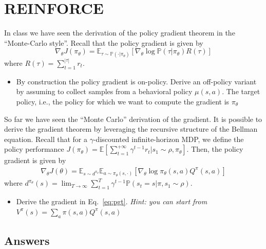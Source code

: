 \documentclass[a4paper]{article}
\begin{document}
\section{REINFORCE}
In class we have seen the derivation of the policy gradient theorem in the ``Monte-Carlo style''. Recall that the policy gradient is given by
\[
    \nabla_\theta J(\pi_\theta) = \mathbb{E}_{\tau \sim \mathbb{P}(\cdot|\pi_\theta)}\left[ \nabla_\theta \log \mathbb{P}(\tau|\pi_\theta)
        R(\tau)
        \right]
\]
where $R(\tau) = \sum_{t=1}^{|\tau|} r_t$. %

\begin{itemize}
    \item By construction the policy gradient is on-policy. Derive an off-policy variant by assuming to collect samples from a behavioral policy $\mu(s,a)$. The target policy, i.e., the policy for which we want to compute the gradient is $\pi_{\theta}$
\end{itemize}

So far we have seen the ``Monte Carlo'' derivation of the gradient.
It is possible to derive the gradient theorem by leveraging the recursive structure of the Bellman equation. Recall that for a $\gamma$-discounted infinite-horizon MDP, we define the policy performance $J(\pi_\theta) = \mathbb{E}\left[\sum_{t=1}^{+\infty} \gamma^{t-1} r_t | s_1 \sim \rho, \pi_\theta \right]$. Then, the policy gradient is given by
\begin{align}
    \label{eq:pgt}
    \nabla_\theta J(\theta) = \mathbb{E}_{s \sim d^{\pi_\theta}} \mathbb{E}_{a \sim \pi_\theta(s, \cdot)}
    \left[
        \nabla_{\theta} \log \pi_\theta(s,a) Q^\pi(s,a)
        \right]
\end{align}
where $d^{\pi_\theta}(s) = \lim_{T \to \infty} \sum_{t=1}^{T} \gamma^{t-1} \mathbb{P}(s_t=s|\pi,s_1 \sim \rho)$.

\begin{itemize}
    \item Derive the gradient in Eq.~\ref{eq:pgt}. \emph{Hint: you can start from $V^{\pi}(s) = \sum_a \pi(s,a) Q^{\pi}(s,a)$}
\end{itemize}

\subsection*{Answers}
\end{document}
